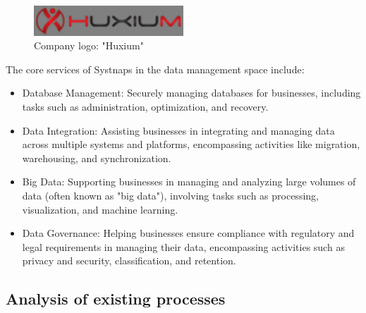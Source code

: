 \begin{figure}[!ht]\centering
\includegraphics[width=0.5\textwidth,angle=00]{assets/fb.png}
\caption{Company logo: "Huxium"}
\end{figure} 
\newpage
\hspace{7mm}The core services of Systnaps in the data management space include: 
\begin{itemize}[label={--}]
    \item Database Management: Securely managing databases for businesses, including tasks such as administration, optimization, and recovery. 

\item Data Integration: Assisting businesses in integrating and managing data across multiple systems and platforms, encompassing activities like migration, warehousing, and synchronization. 

\item Big Data: Supporting businesses in managing and analyzing large volumes of data (often known as "big data"), involving tasks such as processing, visualization, and machine learning. 

\item  Data Governance: Helping businesses ensure compliance with regulatory and legal requirements in managing their data, encompassing activities such as privacy and security, classification, and retention. 

 \end{itemize}
 
\subsection{Analysis of existing processes }

